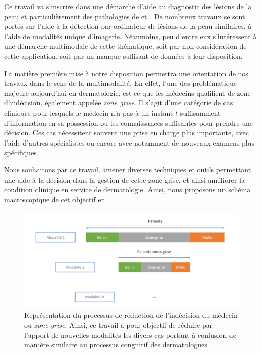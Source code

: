 \renewcommand{\thechapter}{\roman{chapter}}
\setcounter{chapter}{2}
\setcounter{figure}{0}

\label{chap:preamble_context}

Ce travail va s'inscrire dans une démarche d'aide au diagnostic des lésions de la peau et particulièrement des pathologies de  et . De nombreux travaux se sont portés sur l'aide à la détection par ordinateur de lésions de la peau similaires, à l'aide de modalités unique d'imagerie. Néanmoins, peu d'entre eux s'intéressent à une démarche multimodale de cette thématique, soit par non considération de cette application, soit par un manque suffisant de données à leur disposition.\par

La matière première mise à notre disposition permettra une orientation de nos travaux dans le sens de la multimodalité. En effet, l'une des problématique majeure aujourd'hui en dermatologie, est ce que les médecins qualifient de zone d'indécision, également appelée \textit{zone grise}. Il s'agit d'une catégorie de cas cliniques pour lesquels le médecin n'a pas à un instant $t$ suffisamment d'information en sa possession ou les connaissances suffisantes pour prendre une décision. Ces cas nécessitent souvent une prise en charge plus importante, avec l'aide d'autres spécialistes ou encore avec notamment de nouveaux examens plus spécifiques.\par

Nous souhaitons par ce travail, amener diverses techniques et outils permettant une aide à la décision dans la gestion de cette zone grise, et ainsi améliorer la condition clinique en service de dermatologie. Ainsi, nous proposons un schéma macroscopique de cet objectif en .\par

\begin{figure}[H]
    \centering
    \includegraphics[width=\linewidth]{contents/ii_preamble_context/resources/scheme_reduce_indecision.pdf}
    \caption{Représentation du processus de réduction de l'indécision du médecin ou \textit{zone grise}. Ainsi, ce travail à pour objectif de réduire par l'apport de nouvelles modalités les divers cas portant à confusion de manière similaire au processus congnitif des dermatologues.}
    \label{fig:scheme_reduce_indecision}
\end{figure}\par

